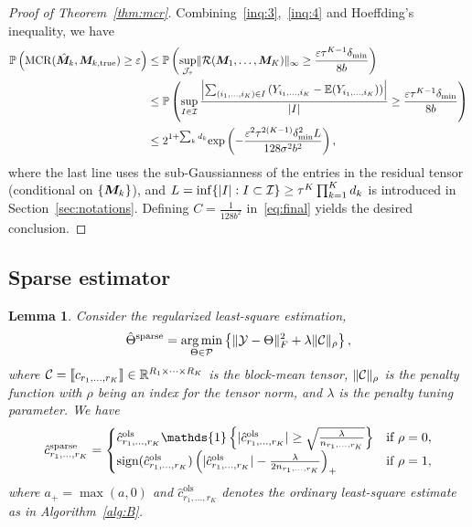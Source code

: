 \documentclass{article}
\newtheorem{lemma}{Lemma}
\DeclareMathOperator*{\mcr}{MCR}
\begin{document}
\begin{appendices}
\begin{proof}[Proof of Theorem~\ref{thm:mcr}]
Combining~\eqref{inq:3},~\eqref{inq:4} and Hoeffding's inequality, we have
\begin{align}\label{eq:final}
\mathbb{P}\left(\mcr(\hat{\mM}_k, \mM_{k,\text{true}}) \geq \varepsilon\right)
&\leq \mathbb{P}\left(\sup_{\tJ_\tau}\mnormSize{}{\tR(\mM_1,\ldots,\mM_K)} \geq {\varepsilon \tau^{K-1}\delta_{\min} \over 8 b}\right)\notag\notag \\
&\leq \mathbb{P}\left(  \sup_{I\in\tI} {\left|\sum_{(i_1,\ldots,i_K)\in I}\left(Y_{i_1,\ldots,i_K}-\mathbb{E}(Y_{i_1,\ldots,i_K})\right)\right|\over |I|}\geq   {\varepsilon \tau^{K-1}\delta_{\min} \over 8 b} \right)\notag \\
&\leq 2^{1+\sum_k d_k}\text{exp}\left( -\frac{\varepsilon^2\tau^{2(K-1)}\delta_{\min}^2L}{128\sigma^2b^2} \right),
\end{align}
where the last line uses the sub-Gaussianness of the entries in the residual tensor (conditional on $\{\bm M_k\}$), and $L=\inf\{|I|: I\subset \mathcal{I}\} \geq \tau^K\prod_{k=1}^Kd_k$ is introduced in Section~\ref{sec:notations}.
Defining $C=\frac{1}{128b^2}$ in~\eqref{eq:final} yields the desired conclusion.


\end{proof}



\subsection{Sparse estimator}
\begin{lemma}\label{prop:sparse}
Consider the regularized least-square estimation,
\begin{equation}\label{eq:opt}
\hat \Theta^{\text{sparse}}=\operatorname*{arg\,min}_{\Theta\in \mathcal{P}}\left\{\lVert\mathcal{Y}-\Theta\rVert_F^2+\lambda \lVert\mathcal{C}\rVert_\rho
\right\},
\end{equation}
where $\mathcal{C}=\llbracket c_{r_1,\ldots,r_K} \rrbracket\in\mathbb{R}^{R_1\times \cdots\times R_K}$ is the block-mean tensor, $\lVert\mathcal{C}\rVert_\rho$ is the penalty function with $\rho$ being an index for the tensor norm, and $\lambda$ is the penalty tuning parameter. We have
\begin{equation}\label{eq:lasso}
\hat c^{\text{sparse}}_{r_1,\ldots,r_K}=
\begin{cases}
\hat c^{\text{ols}}_{r_1,\ldots,r_K}\mathds{1}\left\{|\hat c^{\text{ols}}_{r_1,\ldots,r_K} |\geq {\sqrt{\lambda \over n_{r_1,\ldots,r_K}}}\right\} & \text{if}\ \rho=0,\\
\text{sign}(\hat c^{\text{ols}}_{r_1,\ldots,r_K})\left( |\hat c^{\text{ols}}_{r_1,\ldots,r_K}|-{\lambda \over 2n_{r_1,\ldots,r_K}}  \right)_{+} &\text{if}\ \rho=1,
\end{cases}
\end{equation}
where $a_{+}=\max(a,0)$ and $\hat c^{\text{ols}}_{r_1,\ldots,r_K}$ denotes the ordinary least-square estimate as in Algorithm~\ref{alg:B}. 
\end{lemma}


\end{appendices}
\end{document}

